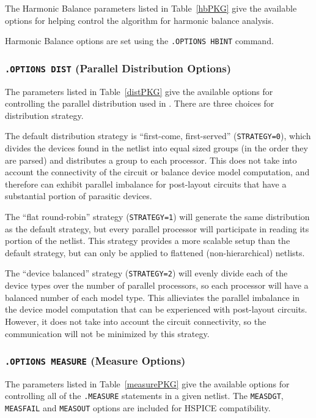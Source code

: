 The Harmonic Balance parameters listed in Table~\ref{hbPKG} give the available
options for helping control the algorithm for harmonic balance analysis.

Harmonic Balance options are set using the \texttt{.OPTIONS HBINT} command.



\subsubsection{\texttt{.OPTIONS DIST} (Parallel Distribution Options)}

The parameters listed in Table~\ref{distPKG} give the available
options for controlling the parallel distribution used in \Xyce{}.
There are three choices for distribution strategy.

The default distribution strategy is ``first-come, first-served''
(\texttt{STRATEGY=0}), which divides the devices found in the netlist
into equal sized groups (in the order they are parsed) and distributes
a group to each processor.  This does not take into account the
connectivity of the circuit or balance device model computation, and
therefore can exhibit parallel imbalance for post-layout circuits that
have a substantial portion of parasitic devices.

The ``flat round-robin'' strategy (\texttt{STRATEGY=1}) will generate
the same distribution as the default strategy, but every parallel
processor will participate in reading its portion of the netlist.
This strategy provides a more scalable setup than the default
strategy, but can only be applied to flattened (non-hierarchical)
netlists.

The ``device balanced'' strategy (\texttt{STRATEGY=2}) will evenly
divide each of the device types over the number of parallel
processors, so each processor will have a balanced number of each
model type.  This allieviates the parallel imbalance in the device
model computation that can be experienced with post-layout circuits.
However, it does not take into account the circuit connectivity, so
the communication will not be minimized by this strategy.



\subsubsection{\texttt{.OPTIONS MEASURE} (Measure Options)}
The parameters listed in Table~\ref{measurePKG} give the available
options for controlling all of the \texttt{.MEASURE} statements in
a given \Xyce{} netlist.  The \texttt{MEASDGT}, \texttt{MEASFAIL}
and \texttt{MEASOUT} options are included for HSPICE compatibility.

